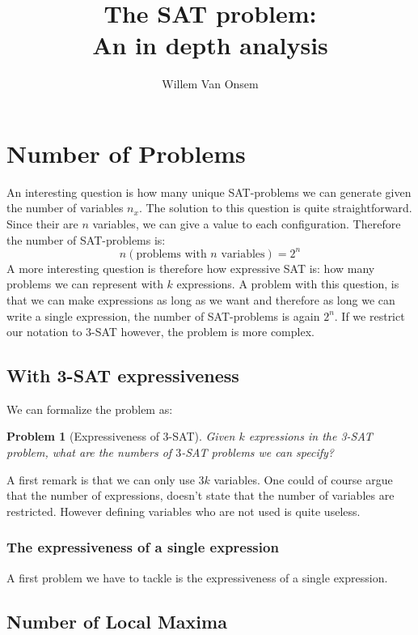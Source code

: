 \documentclass{article}
\title{The SAT problem:\\An in depth analysis}
\author{Willem Van Onsem}
\begin{document}
\maketitle
\tableofcontents
\newtheorem{problem}{Problem}
\newtheorem{definition}{Definition}
\section{Number of Problems}
An interesting question is how many unique SAT-problems we can generate given the number of variables $n_x$. The solution to this question is quite straightforward. Since their are $n$ variables, we can give a value to each configuration. Therefore the number of SAT-problems is:
\begin{equation}
n\left(\mbox{problems with $n$ variables}\right)=2^n
\end{equation}
A more interesting question is therefore how expressive SAT is: how many problems we can represent with $k$ expressions. A problem with this question, is that we can make expressions as long as we want and therefore as long we can write a single expression, the number of SAT-problems is again $2^n$. If we restrict our notation to $3$-SAT however, the problem is more complex.
\subsection{With 3-SAT expressiveness}
We can formalize the problem as:
\begin{problem}[Expressiveness of 3-SAT]
Given $k$ expressions in the 3-SAT problem, what are the numbers of $3$-SAT problems we can specify?
\end{problem}
A first remark is that we can only use $3k$ variables. One could of course argue that the number of expressions, doesn't state that the number of variables are restricted. However defining variables who are not used is quite useless.
\subsubsection{The expressiveness of a single expression}
A first problem we have to tackle is the expressiveness of a single expression.
\subsection{Number of Local Maxima}
\end{document}
